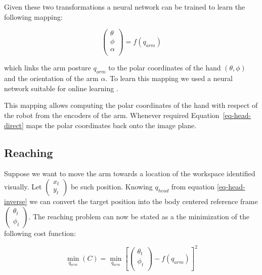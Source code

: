 Given these two transformations a neural network can be trained to
learn the following mapping:

\begin{equation}
  \left(\begin{array}{c}
    \theta \\
    \phi \\
    \alpha \\
    \end{array}\right)
  = f \left(q_{arm}\right)
\label{eq-arm-direct}
\end{equation}

which links the arm posture $q_{arm}$ to the polar coordinates of
the hand $\left(\theta, \phi\right)$ and the orientation of the
arm $\alpha$. To learn this mapping we used a neural network
suitable for online learning \cite{schaal98Constructive}.

This mapping allows computing the polar coordinates of the hand
with respect of the robot from the encoders of the arm. Whenever
required Equation~\ref{eq-head-direct} maps the polar coordinates
back onto the image plane.

\subsection{Reaching}
\label{sec:reaching} Suppose we want to move the arm towards a
location of the workspace identified visually. Let
$\left(\begin{array}{c} x_t \\ y_t\end{array}\right)$ be such
position. Knowing $q_{head}$ from equation \ref{eq-head-inverse}
we can convert the target position into the body centered
reference frame $\left(\begin{array}{c} \theta_t  \\
\phi_t\end{array}\right)$. The reaching problem can now be stated
as a the minimization of the following cost function:

\begin{equation}
  \displaystyle\min_{q_{arm}}\left(C\right)=\displaystyle\min_{q_{arm}}\left[
  \left(
  \begin{array}{c}
    \theta_t \\
    \phi_t \\
    \end{array}\right)
  -f \left(q_{arm}\right)
  \right]^2
\label{eq-reaching1}
\end{equation}

